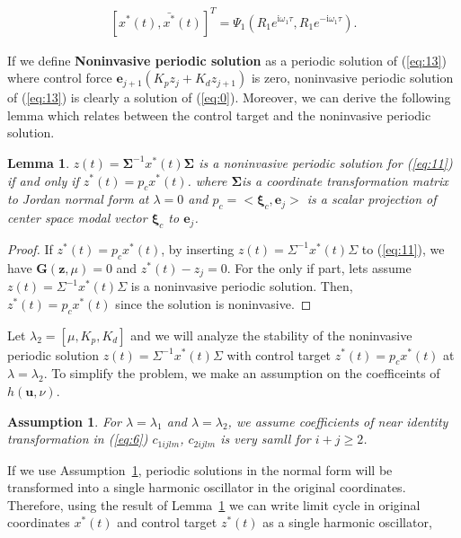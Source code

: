 \documentclass[openacc]{rsproca_new}%
\def\vec#1{\ensuremath{\mathbf{#1}}}
\newcommand{\Eref}[1]{(\ref{#1})}
\newcommand{\asref}[1]{Assumption~\ref{#1}}
\newcommand{\Lref}[1]{Lemma~\ref{#1}}
\newtheorem{lemma}{\bf Lemma}[section]
\newtheorem{assumption}{\bf Assumption}[section]
\begin{document}
\begin{align}\label{eq:16}
    [x^*(t),\bar {x^*}(t)]^T=\Psi_1(R_1e^{\textrm{i}\omega_1 \tau},R_1e^{-\textrm{i}\omega_1 \tau}).
\end{align}

\noindent If we define \textbf{Noninvasive periodic solution} as a periodic solution of \Eref{eq:13} where control force $\vec{e}_{j+1}(K_pz_j+K_d z_{j+1})$ is zero, noninvasive periodic solution of \Eref{eq:13} is clearly a solution of \Eref{eq:0}. Moreover, we can derive the following lemma which relates between the control target and the noninvasive periodic solution.

\begin{lemma}\label{l1}
$z(t)=\vec{\Sigma}^{-1}x^*(t)\vec{\Sigma}$ is a noninvasive periodic solution for \Eref{eq:11} if and only if $z^*(t)=p_c x^*(t)$.
where $\vec{\Sigma}$is a coordinate transformation matrix to Jordan normal form at $\lambda=0$ and $p_c=<\vec{\xi}_c,\vec{e}_{j}>$ is a scalar projection of center space modal vector $\vec{\xi}_c$ to $\vec{e}_{j}$.
\end{lemma}

\begin{proof}
If $z^*(t)=p_cx^*(t)$, by inserting $z(t)=\Sigma^{-1}x^*(t)\Sigma$ to \Eref{eq:11}, we have $\vec{G}(\vec{z},\mu)=0$ and $z^*(t)-z_j=0$. For the only if part, lets assume $z(t)=\Sigma^{-1}x^*(t)\Sigma$ is a noninvasive periodic solution. Then, $z^*(t)=p_cx^*(t)$ since the solution is noninvasive.
\end{proof}

\noindent Let $\lambda_2=[\mu,K_p,K_d]$ and we will analyze the stability of the noninvasive periodic solution $z(t)=\Sigma^{-1}x^*(t)\Sigma$ with control target $z^*(t)=p_cx^*(t)$  at $\lambda=\lambda_2$. To simplify the problem, we make an assumption on the coefficeints of $h(\vec{u},\nu)$.

\begin{assumption}\label{a1}
For $\lambda=\lambda_1$ and $\lambda=\lambda_2$, we assume coefficients of near identity transformation in \Eref{eq:6} $c_{1ijlm}$, $c_{2ijlm}$ is very samll for $i+j\geq 2$.
\end{assumption}

\noindent  If we use \asref{a1}, periodic solutions in the normal form will be transformed into a single harmonic oscillator in the original coordinates. Therefore, using the result of \Lref{l1} we can write limit cycle in original coordinates $x^*(t)$ and control target  $z^*(t)$ as a single harmonic oscillator,
\end{document}
